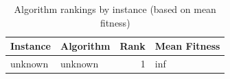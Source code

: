 \begin{table}[htbp]
\centering
\caption{Algorithm rankings by instance (based on mean fitness)}
\label{tab:instance_rankings}
\begin{tabular}{llrl}
\toprule
Instance & Algorithm & Rank & Mean Fitness \\
\midrule
unknown & unknown & 1 & inf \\
\bottomrule
\end{tabular}
\end{table}
